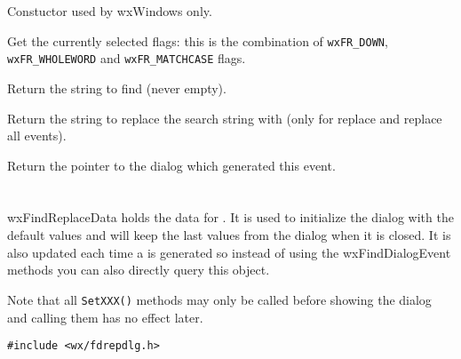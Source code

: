 Constuctor used by wxWindows only.

\label{wxfinddialogeventgetflags}


Get the currently selected flags: this is the combination of {\tt wxFR\_DOWN},
{\tt wxFR\_WHOLEWORD} and {\tt wxFR\_MATCHCASE} flags.

\label{wxfinddialogeventgetfindstring}


Return the string to find (never empty).

\label{wxfinddialogeventgetreplacestring}


Return the string to replace the search string with (only for replace and
replace all events).

\label{wxfinddialogeventgetdialog}


Return the pointer to the dialog which generated this event.

\section{}\label{wxfindreplacedata}

wxFindReplaceData holds the data for 
. It is used to initialize
the dialog with the default values and will keep the last values from the
dialog when it is closed. It is also updated each time a 
 is generated so instead of
using the wxFindDialogEvent methods you can also directly query this object.

Note that all {\tt SetXXX()} methods may only be called before showing the
dialog and calling them has no effect later.


\begin{verbatim}
#include <wx/fdrepdlg.h>
\end{verbatim}



